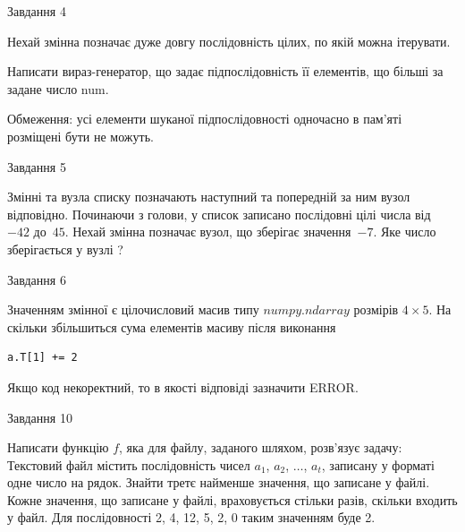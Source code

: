 \documentclass[12pt, ukrainian]{article}
\begin{document}
{\begin{minipage}[t]{8.0cm}
\end{minipage}


               
{\begin{center}Завдання {4}\end{center}}
\vspace{-4mm}
Нехай змінна  позначає дуже довгу послідовність цілих, по якій можна ітерувати.

Написати вираз-генератор, що задає підпослідовність її елементів, що більші за задане число num.

Обмеження: усі елементи шуканої підпослідовності одночасно в пам'яті розміщені бути не можуть.\par

\vspace{10mm}
               
{\begin{center}Завдання {5}\end{center}}
\vspace{-4mm}
Змінні  та  вузла списку позначають наступний та попередній за ним вузол відповідно. Починаючи з голови, у список записано послідовні цілі числа від~$-42$ до~$45$. Нехай змінна  позначає вузол, що зберігає значення~$-7$.
Яке число зберігається у вузлі  ?\par

               
{\begin{center}Завдання {6}\end{center}}
\vspace{-4mm}
Значенням змінної  є цілочисловий масив типу $numpy.ndarray$ розмірів $4{\times}5$. На скільки збільшиться сума елементів масиву  після виконання
\begin{verbatim}
a.T[1] += 2
\end{verbatim}


Якщо код некоректний, то в якості відповіді зазначити ERROR.\par

               
{\begin{center}Завдання {10}\end{center}}
\vspace{-4mm}

Написати функцію $f$, яка для файлу, заданого шляхом, розв’язує задачу:\\ Текстовий файл містить послідовність чисел $a_1$, $a_2$, $\ldots$, $a_t$, записану у форматі одне число на рядок. Знайти третє найменше значення, що записане у файлі. Кожне значення, що записане у файлі, враховується стільки разів, скільки входить у файл. Для послідовності 2, 4, 12, 5, 2, 0 таким значенням буде 2.

}
\end{document}
